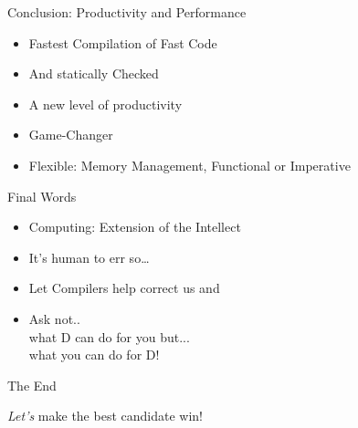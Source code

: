 \documentclass[xcolor=dvipsnames]{beamer}
\begin{document}
\begin{frame}[fragile]{Conclusion: Productivity and Performance}
  \begin{itemize}[<+->]
  \item Fastest Compilation of Fast Code
  \item And statically Checked
  \item A new level of productivity
  \item Game-Changer
  \item Flexible: Memory Management, Functional or Imperative
  \end{itemize}
\end{frame}

\begin{frame}[fragile]{Final Words}
  \begin{itemize}[<+->]
  \item Computing: Extension of the Intellect
  \item It's human to err so\ldots
  \item Let Compilers help correct us and
  \item Ask not..\\
    what D can do for you but...\\
    what you can do for D!
  \end{itemize}
\end{frame}

\begin{frame}[fragile]{The End}
  \begin{figure}
  \end{figure}
  \emph{Let's} make the best candidate win!
\end{frame}

\end{document}
